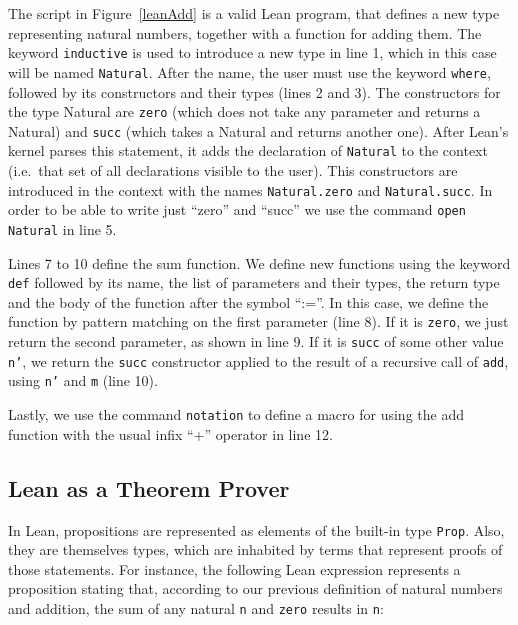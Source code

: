 The script in Figure~\ref{leanAdd} is a valid Lean program, that defines a new type representing natural numbers, together with a function for adding them.
The keyword \texttt{inductive} is used to introduce a new type in line 1, which in this case will be named \texttt{Natural}. After the name, the user must use the keyword \texttt{where}, followed by its constructors and their types (lines 2 and 3). The constructors for the type Natural are \texttt{zero} (which does not take any parameter and returns a Natural) and \texttt{succ} (which takes a Natural and returns another one).
After Lean's kernel parses this statement, it adds the declaration of \texttt{Natural}
to the context (i.e.\ that set of all declarations visible to the user).
This constructors are introduced in the context with the names \texttt{Natural.zero} and \texttt{Natural.succ}. In order to be able to write just ``zero'' and ``succ'' we use the command \texttt{open Natural} in line 5.

Lines 7 to 10 define the sum function. We define new functions using the keyword \texttt{def} followed by its name, the list of parameters and their types, the return type and the body of the function after the symbol ``:=''. In this case, we define the function by pattern matching on the first parameter (line 8). If it is \texttt{zero}, we just return the second parameter, as shown in line 9. If it is \texttt{succ} of some other value \texttt{n'}, we return the \texttt{succ} constructor applied to the result of a recursive call of \texttt{add}, using \texttt{n'} and \texttt{m} (line 10).

Lastly, we use the command \texttt{notation} to define a macro for using the add function with the usual infix ``+'' operator in line 12.



\subsection{Lean as a Theorem Prover}

In Lean, propositions are represented as elements of the built-in type \texttt{Prop}. Also, they are themselves types, which are inhabited by terms that represent proofs of those statements. For instance, the following Lean expression represents a proposition stating that, according to our previous definition of natural numbers and addition, the sum of any natural \texttt{n} and \texttt{zero} results in \texttt{n}:

